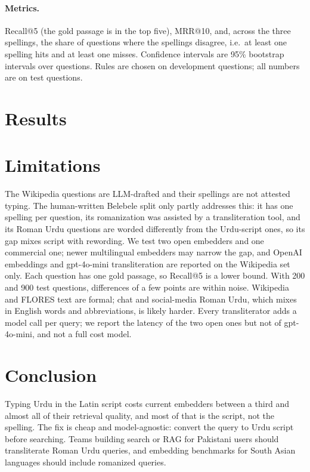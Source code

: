 \documentclass[11pt]{article}
\begin{document}
\paragraph{Metrics.} Recall@5 (the gold passage is in the top five), MRR@10, and, across the three spellings, the share of questions where the spellings disagree, i.e.\ at least one spelling hits and at least one misses. Confidence intervals are 95\% bootstrap intervals over questions. Rules are chosen on development questions; all numbers are on test questions.

\section{Results}



\section{Limitations}

The Wikipedia questions are LLM-drafted and their spellings are not attested typing. The human-written Belebele split only partly addresses this: it has one spelling per question, its romanization was assisted by a transliteration tool, and its Roman Urdu questions are worded differently from the Urdu-script ones, so its gap mixes script with rewording. We test two open embedders and one commercial one; newer multilingual embedders may narrow the gap, and OpenAI embeddings and gpt-4o-mini transliteration are reported on the Wikipedia set only. Each question has one gold passage, so Recall@5 is a lower bound. With 200 and 900 test questions, differences of a few points are within noise. Wikipedia and FLORES text are formal; chat and social-media Roman Urdu, which mixes in English words and abbreviations, is likely harder. Every transliterator adds a model call per query; we report the latency of the two open ones but not of gpt-4o-mini, and not a full cost model.

\section{Conclusion}

Typing Urdu in the Latin script costs current embedders between a third and almost all of their retrieval quality, and most of that is the script, not the spelling. The fix is cheap and model-agnostic: convert the query to Urdu script before searching. Teams building search or RAG for Pakistani users should transliterate Roman Urdu queries, and embedding benchmarks for South Asian languages should include romanized queries.
\end{document}
